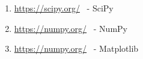 \begin{enumerate}
\item \url{https://scipy.org/} \ - SciPy
\item \url{https://numpy.org/} \ - NumPy
\item \url{https://numpy.org/} \ - Matplotlib
\end{enumerate}
